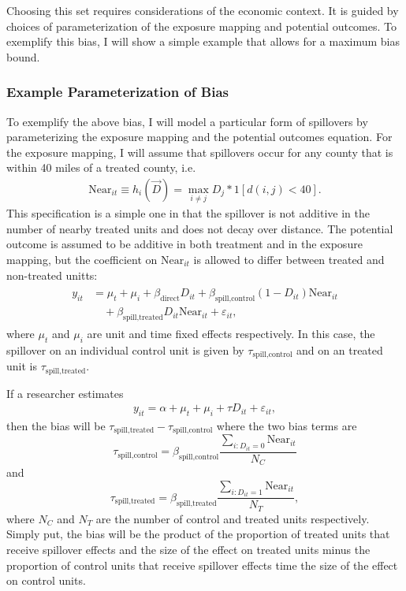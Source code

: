 \documentclass[11pt]{article}
\begin{document}
Choosing this set requires considerations of the economic context. It is guided by choices of parameterization of the exposure mapping and potential outcomes. To exemplify this bias, I will show a simple example that allows for a maximum bias bound. 


\subsubsection{Example Parameterization of Bias}

To exemplify the above bias, I will model a particular form of spillovers by parameterizing the exposure mapping and the potential outcomes equation. For the exposure mapping, I will assume that spillovers occur for any county that is within 40 miles of a treated county, i.e. 
\begin{align}
    \label{eq:example_exposure}
    \text{Near}_{it} \equiv h_i(\vec{D}) = \max_{i \neq j} D_j * 1[ d(i,j) < 40 ].
\end{align}
This specification is a simple one in that the spillover is not additive in the number of nearby treated units and does not decay over distance. The potential outcome is assumed to be additive in both treatment and in the exposure mapping, but the coefficient on $\text{Near}_{it}$ is allowed to differ between treated and non-treated unitts:
\begin{align}
    \label{eq:example_po}
    \begin{split}
        y_{it} &= \mu_t + \mu_i + \beta_{\text{direct}} D_{it} + \beta_{\text{spill,control}} (1-D_{it}) \text{Near}_{it} \\
        &\quad + \beta_{\text{spill,treated}} D_{it} \text{Near}_{it} + \varepsilon_{it},
    \end{split}
\end{align}
where $\mu_t$ and $\mu_i$ are unit and time fixed effects respectively. In this case, the spillover on an individual control unit is given by $\tau_{\text{spill,control}}$ and on an treated unit is $\tau_{\text{spill,treated}}$. 

If a researcher estimates 
\begin{align}
    \label{eq:twfe}    
    y_{it} = \alpha + \mu_t + \mu_i + \tau D_{it} + \varepsilon_{it},    
\end{align}
then the bias will be $\tau_{\text{spill,treated}} - \tau_{\text{spill,control}}$ where the two bias terms are \[ 
    \tau_{\text{spill,control}} = \beta_{\text{spill,control}} \frac{\sum_{i: D_{it} = 0} \text{Near}_{it}}{N_C}
\] and \[ 
    \tau_{\text{spill,treated}} = \beta_{\text{spill,treated}} \frac{\sum_{i: D_{it} = 1} \text{Near}_{it}}{N_T},
\]
where $N_C$ and $N_T$ are the number of control and treated units respectively. Simply put, the bias will be the product of the proportion of treated units that receive spillover effects and the size of the effect on treated units minus the proportion of control units that receive spillover effects time the size of the effect on control units. 
\end{document}
